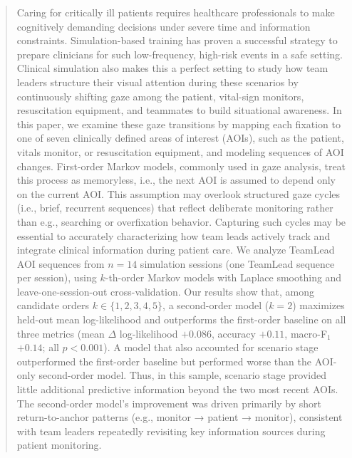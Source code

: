\documentclass[runningheads]{llncs}
\begin{document}
\begin{abstract}
  Caring for critically ill patients requires healthcare professionals to make cognitively demanding decisions under severe time and information constraints. Simulation-based training has proven a successful strategy to prepare clinicians for such low-frequency, high-risk events in a safe setting. Clinical simulation also makes this a perfect setting to study how team leaders structure their visual attention during these scenarios by continuously shifting gaze among the patient, vital-sign monitors, resuscitation equipment, and teammates to build situational awareness. In this paper, we examine these gaze transitions by mapping each fixation to one of seven clinically defined areas of interest (AOIs), such as the patient, vitals monitor, or resuscitation equipment, and modeling sequences of AOI changes. First-order Markov models, commonly used in gaze analysis, treat this process as memoryless, i.e., the next AOI is assumed to depend only on the current AOI. This assumption may overlook structured gaze cycles (i.e., brief, recurrent sequences) that reflect deliberate monitoring rather than e.g., searching or overfixation behavior. Capturing such cycles may be essential to accurately characterizing how team leads actively track and integrate clinical information during patient care. We analyze TeamLead AOI sequences from $n{=}14$ simulation sessions (one TeamLead sequence per session), using $k$-th-order Markov models with Laplace smoothing and leave-one-session-out cross-validation. Our results show that, among candidate orders $k \in \{1,2,3,4,5\}$, a second-order model ($k{=}2$) maximizes held-out mean log-likelihood and outperforms the first-order baseline on all three metrics (mean $\Delta$ log-likelihood $+0.086$, accuracy $+0.11$, macro-F$_1$ $+0.14$; all $p<0.001$). A model that also accounted for scenario stage outperformed the first-order baseline but performed worse than the AOI-only second-order model. Thus, in this sample, scenario stage provided little additional predictive information beyond the two most recent AOIs. The second-order model’s improvement was driven primarily by short return-to-anchor patterns (e.g., monitor → patient → monitor), consistent with team leaders repeatedly revisiting key information sources during patient monitoring.

\end{abstract}
\end{document}
